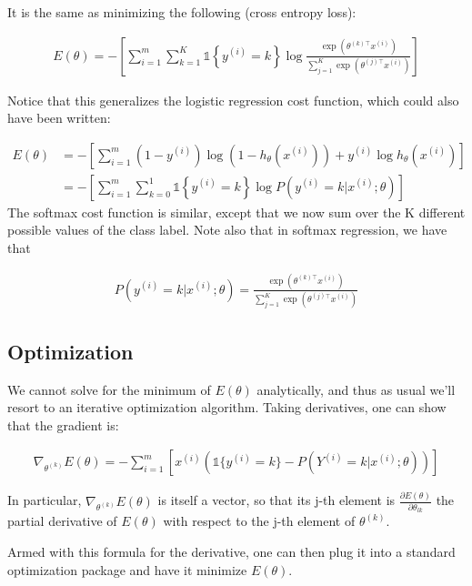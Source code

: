 It is the same as minimizing the following (cross entropy loss):

\begin{align} 
	E(\theta) = - \left[ \sum_{i=1}^{m} \sum_{k=1}^{K} \mathds{1}\left\{y^{(i)} = k\right\} \log \frac{\exp(\theta^{(k)\top} x^{(i)})}{\sum_{j=1}^K \exp(\theta^{(j)\top} x^{(i)})}\right] 
\end{align}

Notice that this generalizes the logistic regression cost function, which could also have been written:

\begin{align}
	E(\theta) &= - \left[ \sum_{i=1}^m (1-y^{(i)}) \log (1-h_\theta(x^{(i)})) + y^{(i)} \log h_\theta(x^{(i)}) \right] \\ 
			  &= - \left[ \sum_{i=1}^{m} \sum_{k=0}^{1} \mathds{1}\left\{y^{(i)} = k\right\} \log P(y^{(i)} = k | x^{(i)} ; \theta) \right] 
\end{align}
The softmax cost function is similar, except that we now sum over the K different possible values of the class label. Note also that in softmax regression, we have that

\begin{align}
	P(y^{(i)} = k | x^{(i)} ; \theta) = \frac{\exp(\theta^{(k)\top} x^{(i)})}{\sum_{j=1}^K \exp(\theta^{(j)\top} x^{(i)}) }
\end{align}

\subsection{Optimization}

We cannot solve for the minimum of $E(\theta)$ analytically, and thus as usual we’ll resort to an iterative optimization algorithm. Taking derivatives, one can show that the gradient is:

\begin{align} \nabla_{\theta^{(k)}} E(\theta) = - \sum_{i=1}^{m}{ \left[ x^{(i)} \left( \mathds{1} \{ y^{(i)} = k\} - P(Y^{(i)} = k | x^{(i)}; \theta) \right) \right] } \end{align}

In particular, $\nabla_{\theta^{(k)}} E(\theta)$ is itself a vector, so that its j-th element is $\frac{\partial E(\theta)}{\partial \theta_{lk}}$ the partial derivative of $E(\theta)$ with respect to the j-th element of $\theta^{(k)}$.

Armed with this formula for the derivative, one can then plug it into a standard optimization package and have it minimize $E(\theta)$.


